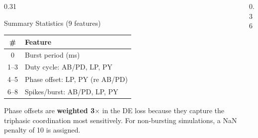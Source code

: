 \documentclass[final]{beamer}
\newcommand{\highlight}[1]{\textcolor{tuered}{\textbf{#1}}}
\begin{document}
\begin{frame}[t]{}
\begin{columns}[t]
\begin{column}{0.31\paperwidth}
  \begin{block}{Summary Statistics (9 features)}
    \small
    \begin{tabular}{cl}
      \toprule
      \textbf{\#} & \textbf{Feature} \\
      \midrule
      0   & Burst period (ms) \\
      1--3 & Duty cycle: AB/PD, LP, PY \\
      4--5 & Phase offset: LP, PY (re AB/PD) \\
      6--8 & Spikes/burst: AB/PD, LP, PY \\
      \bottomrule
    \end{tabular}
    \vskip0.3cm
    Phase offsets are \highlight{weighted 3$\times$} in the DE loss because
    they capture the triphasic coordination most sensitively.
    For non-bursting simulations, a NaN penalty of 10 is assigned.
  \end{block}

\end{column}

\begin{column}{0.36\paperwidth}


\end{column}
\end{columns}
\end{frame}
\end{document}
